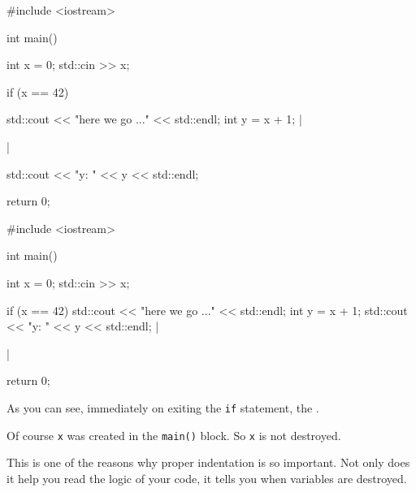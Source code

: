 \begin{consolethree}[escapeinside=||]
#include <iostream>

int main()
{    
     int x = 0;
     std::cin >> x;
     
     if (x == 42)
     {   
         std::cout << "here we go ..." << std::endl;
         int y = x + 1;
         ||
     }
     std::cout << "y: " << y << std::endl;

     return 0;
}
\end{consolethree}



\begin{consolethree}[escapeinside=||]
#include <iostream>

int main()
{    
     int x = 0;
     std::cin >> x;

     if (x == 42)
     {   
         std::cout << "here we go ..." <<
         std::endl;
         int y = x + 1;
         std::cout << "y: " << y << std::endl;
     }
     ||
             
     return 0;
}
\end{consolethree}
As you can see, immediately on exiting the \texttt{if} statement, the .

Of course \texttt{x} was created in the \texttt{main()} block. So \texttt{x} is not destroyed.

This is one of the reasons why proper indentation is so important. Not only does it help you read the logic of your code, it tells you when variables are destroyed.

